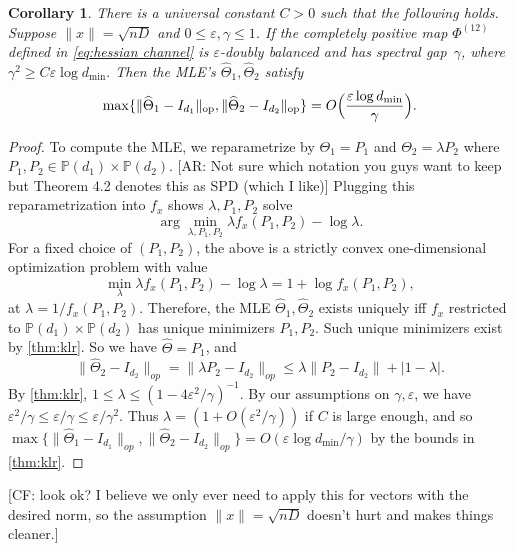 \documentclass[aos]{imsart}
\newtheorem{corollary}[theorem]{Corollary}
\theoremstyle{definition}
\numberwithin{equation}{section}
\DeclareMathOperator{\op}{op}
\DeclarePairedDelimiter{\norm}{\lVert}{\rVert}
\newcommand{\htheta}{\widehat{\Theta}}
\newcommand{\ot}{\otimes}
\newcommand{\eps}{\varepsilon}
\newcommand{\SPD}{\mathbb{P}}
\newcommand{\CF}[1]{{\color{purple}[CF: #1]}}
\newcommand{\AR}[1]{{\color{orange}[AR: #1]}}
\begin{document}
\begin{corollary}\label{cor:klr}
There is a universal constant $C>0$ such that the following holds. Suppose $\|x\| = \sqrt{nD}$ and $0 \leq \eps, \gamma \leq 1$. If the completely positive map $\Phi^{(12)}$ defined in \cref{eq:hessian channel} is $\eps$-doubly balanced and has spectral gap~$\gamma$, where $\gamma^2 \geq C \eps \log d_{\min}.$ Then the MLE's $\htheta_1, \htheta_2$ satisfy
\begin{align*}
  \max \{ \norm{\htheta_1 - I_{d_1}}_{\op}, \norm{\htheta_2 - I_{d_2}}_{\op} \} = O\Bigl(\frac{\eps \log d_{\min}}\gamma\Bigr).
\end{align*}
\end{corollary}
\begin{proof}
To compute the MLE, we reparametrize by $\Theta_1 = P_1$ and $\Theta_2 = \lambda P_2$ where $P_1,P_2 \in \SPD(d_1) \times \SPD(d_2)$. \AR{Not sure which notation you guys want to keep but Theorem 4.2 denotes this as SPD (which I like)}
Plugging this reparametrization into $f_x$ shows $\lambda, P_1, P_2$ solve
$$\arg\min_{\lambda, P_1, P_2} \lambda f_x(P_1, P_2) - \log \lambda.$$
For a fixed choice of $(P_{1},P_{2})$, the above is a strictly convex one-dimensional optimization problem with value
\[ \min_{\lambda} \lambda f_x(P_1, P_2) - \log \lambda  = 1 + \log f_{x}(P_{1},P_{2}) , \]
at $\lambda = 1/f_x(P_1, P_2)$. Therefore, the MLE $\htheta_1, \htheta_2$ exists uniquely iff $f_x$ restricted to $\SPD(d_1) \times \SPD(d_2)$ has unique minimizers $P_1, P_2$. Such unique minimizers exist by \cref{thm:klr}. 
So we have $\htheta = P_1$, and
$$ \|\htheta_2 - I_{d_2} \|_{op} = \|\lambda P_2  - I_{d_2} \|_{op} \leq \lambda \|P_2 - I_{d_2}\| + |1 - \lambda|.$$
By \cref{thm:klr}, $1 \leq \lambda \leq (1 - 4 \eps^2/\gamma)^{-1}.$ By our assumptions on $\gamma, \eps$, we have $\eps^2/\gamma \leq \eps/\gamma \leq \eps/\gamma^2$. Thus $\lambda = (1 + O(\eps^2/\gamma))$ if $C$ is large enough, and so
$\max\{\|\htheta_1 - I_{d_1} \|_{op}, \|\htheta_2 - I_{d_2} \|_{op} \} = O(\eps \log d_{\min}/\gamma)$ by the bounds in \cref{thm:klr}. \end{proof}

\CF{look ok? I believe we only ever need to apply this for vectors with the desired norm, so the assumption $\|x\| = \sqrt{nD}$ doesn't hurt and  makes things cleaner.}
\end{document}

